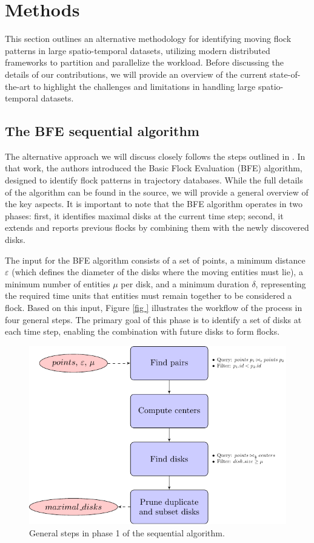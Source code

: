 \section{Methods}
This section outlines an alternative methodology for identifying moving flock patterns in large spatio-temporal datasets, utilizing modern distributed frameworks to partition and parallelize the workload.  Before discussing the details of our contributions, we will provide an overview of the current state-of-the-art to highlight the challenges and limitations in handling large spatio-temporal datasets.

\subsection{The BFE sequential algorithm}
The alternative approach we will discuss closely follows the steps outlined in \cite{vieira_2009}. In that work, the authors introduced the Basic Flock Evaluation (BFE) algorithm, designed to identify flock patterns in trajectory databases. While the full details of the algorithm can be found in the source, we will provide a general overview of the key aspects. It is important to note that the BFE algorithm operates in two phases: first, it identifies maximal disks at the current time step; second, it extends and reports previous flocks by combining them with the newly discovered disks.

The input for the BFE algorithm consists of a set of points, a minimum distance $\varepsilon$ (which defines the diameter of the disks where the moving entities must lie), a minimum number of entities $\mu$ per disk, and a minimum duration $\delta$, representing the required time units that entities must remain together to be considered a flock. Based on this input, Figure \ref{fig
} illustrates the workflow of the process in four general steps. The primary goal of this phase is to identify a set of disks at each time step, enabling the combination with future disks to form flocks.

\begin{figure}
    \centering
    \includegraphics[width=\linewidth]{figures/MF_flowchart}
    \caption{General steps in phase 1 of the sequential algorithm.}\label{fig:MF_flowchart}
\end{figure}

